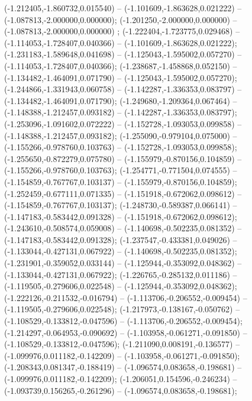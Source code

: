  (-1.212405,-1.860732,0.015540) -- (-1.101609,-1.863628,0.021222) -- (-1.087813,-2.000000,0.000000);
 (-1.201250,-2.000000,0.000000) -- (-1.087813,-2.000000,0.000000) ;
 (-1.222404,-1.723775,0.029468) -- (-1.114053,-1.728407,0.040366) -- (-1.101609,-1.863628,0.021222);
 (-1.231183,-1.589648,0.041698) -- (-1.125043,-1.595002,0.057270) -- (-1.114053,-1.728407,0.040366);
 (-1.238687,-1.458868,0.052150) -- (-1.134482,-1.464091,0.071790) -- (-1.125043,-1.595002,0.057270);
 (-1.244866,-1.331943,0.060758) -- (-1.142287,-1.336353,0.083797) -- (-1.134482,-1.464091,0.071790);
 (-1.249680,-1.209364,0.067464) -- (-1.148388,-1.212457,0.093182) -- (-1.142287,-1.336353,0.083797);
 (-1.253096,-1.091602,0.072222) -- (-1.152728,-1.093053,0.099858) -- (-1.148388,-1.212457,0.093182);
 (-1.255090,-0.979104,0.075000) -- (-1.155266,-0.978760,0.103763) -- (-1.152728,-1.093053,0.099858);
 (-1.255650,-0.872279,0.075780) -- (-1.155979,-0.870156,0.104859) -- (-1.155266,-0.978760,0.103763);
 (-1.254771,-0.771504,0.074555) -- (-1.154859,-0.767767,0.103137) -- (-1.155979,-0.870156,0.104859);
 (-1.252459,-0.677111,0.071335) -- (-1.151918,-0.672062,0.098612) -- (-1.154859,-0.767767,0.103137);
 (-1.248730,-0.589387,0.066141) -- (-1.147183,-0.583442,0.091328) -- (-1.151918,-0.672062,0.098612);
 (-1.243610,-0.508574,0.059008) -- (-1.140698,-0.502235,0.081352) -- (-1.147183,-0.583442,0.091328);
 (-1.237547,-0.433381,0.049026) -- (-1.133044,-0.427131,0.067922) -- (-1.140698,-0.502235,0.081352);
 (-1.231901,-0.359052,0.033144) -- (-1.125944,-0.353092,0.048362) -- (-1.133044,-0.427131,0.067922);
 (-1.226765,-0.285132,0.011186) -- (-1.119505,-0.279606,0.022548) -- (-1.125944,-0.353092,0.048362);
 (-1.222126,-0.211532,-0.016794) -- (-1.113706,-0.206552,-0.009454) -- (-1.119505,-0.279606,0.022548);
 (-1.217973,-0.138167,-0.050762) -- (-1.108529,-0.133812,-0.047596) -- (-1.113706,-0.206552,-0.009454);
 (-1.214297,-0.064953,-0.090692) -- (-1.103958,-0.061271,-0.091850) -- (-1.108529,-0.133812,-0.047596);
 (-1.211090,0.008191,-0.136577) -- (-1.099976,0.011182,-0.142209) -- (-1.103958,-0.061271,-0.091850);
 (-1.208343,0.081347,-0.188419) -- (-1.096574,0.083658,-0.198681) -- (-1.099976,0.011182,-0.142209);
 (-1.206051,0.154596,-0.246234) -- (-1.093739,0.156265,-0.261296) -- (-1.096574,0.083658,-0.198681);

